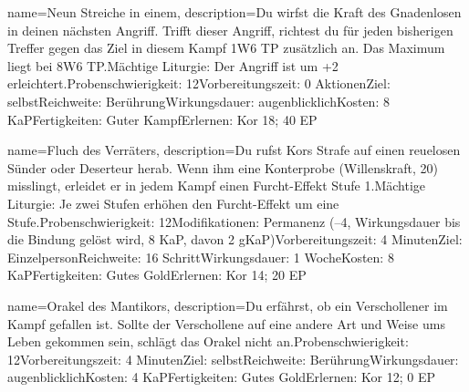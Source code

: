 {
    name={Neun Streiche in einem},
    description={Du wirfst die Kraft des Gnadenlosen in deinen nächsten Angriff. Trifft dieser Angriff, richtest du für jeden bisherigen Treffer gegen das Ziel in diesem Kampf 1W6 TP zusätzlich an. Das Maximum liegt bei 8W6 TP.\newline Mächtige Liturgie: Der Angriff ist um +2 erleichtert.\newline Probenschwierigkeit: 12\newline Vorbereitungszeit: 0 Aktionen\newline Ziel: selbst\newline Reichweite: Berührung\newline Wirkungsdauer: augenblicklich\newline Kosten: 8 KaP\newline Fertigkeiten: Guter Kampf\newline Erlernen: Kor 18; 40 EP}
}


{
    name={Fluch des Verräters},
    description={Du rufst Kors Strafe auf einen reuelosen Sünder oder Deserteur herab. Wenn ihm eine Konterprobe (Willenskraft, 20) misslingt, erleidet er in jedem Kampf einen Furcht-Effekt Stufe 1.\newline Mächtige Liturgie: Je zwei Stufen erhöhen den Furcht-Effekt um eine Stufe.\newline Probenschwierigkeit: 12\newline Modifikationen: Permanenz (–4, Wirkungsdauer bis die Bindung gelöst wird, 8 KaP, davon 2 gKaP)\newline Vorbereitungszeit: 4 Minuten\newline Ziel: Einzelperson\newline Reichweite: 16 Schritt\newline Wirkungsdauer: 1 Woche\newline Kosten: 8 KaP\newline Fertigkeiten: Gutes Gold\newline Erlernen: Kor 14; 20 EP}
}


{
    name={Orakel des Mantikors},
    description={Du erfährst, ob ein Verschollener im Kampf gefallen ist. Sollte der Verschollene auf eine andere Art und Weise ums Leben gekommen sein, schlägt das Orakel nicht an.\newline Probenschwierigkeit: 12\newline Vorbereitungszeit: 4 Minuten\newline Ziel: selbst\newline Reichweite: Berührung\newline Wirkungsdauer: augenblicklich\newline Kosten: 4 KaP\newline Fertigkeiten: Gutes Gold\newline Erlernen: Kor 12; 0 EP}
}


